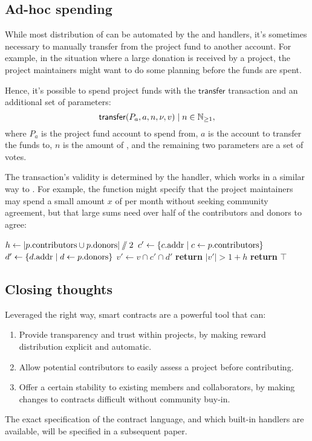 \subsection{Ad-hoc spending}

While most distribution of \oscoin{} can be automated by the 
and  handlers, it's sometimes necessary to manually
transfer \oscoin{} from the project fund to another account. For example, in
the situation where a large donation is received by a project, the project
maintainers might want to do some planning before the funds are spent.

Hence, it's possible to spend project funds with the $\mathsf{transfer}$
transaction and an additional set of parameters:
\[
    \mathsf{transfer}\lparen P_a, a, n, \nu, v\rparen \mid n \in \mathbb{N}_{\geq 1},
\]
where $P_a$ is the project fund account to spend from, $a$ is the account to
transfer the funds to, $n$ is the amount of \oscoin{}, and the remaining two
parameters are a set of votes.

The transaction's validity is determined by the  handler,
which works in a similar way to . For
example, the function might specify that the project maintainers may spend a small
amount $x$ of \oscoin{} per month without seeking community agreement, but that
large sums need over half of the contributors and donors to agree:
\medskip
\begin{algorithmic}[0]
            \State $h \gets |p.{\mathrm{contributors}} \cup p.{\mathrm{donors}}| \sslash 2$
            \State $c' \gets \{ c.{\mathrm{addr}} \mid c \gets p.{\mathrm{contributors}} \}$
            \State $d' \gets \{ d.{\mathrm{addr}} \mid d \gets p.{\mathrm{donors}} \}$
            \State $v' \gets v \cap c' \cap d'$
            \State \textbf{return} $|v'| > 1 + h$
            \Else
            \State \textbf{return} $\top$
        \EndIf
    \EndProcedure
\end{algorithmic}

\subsection{Closing thoughts}

Leveraged the right way, smart contracts are a powerful tool that can:

\begin{enumerate}
    \item Provide transparency and trust within projects, by making reward
        distribution explicit and automatic.
    \item Allow potential contributors to easily assess a project before contributing.
    \item Offer a certain stability to existing members and collaborators, by
        making changes to contracts difficult without community buy-in.
\end{enumerate}

\noindent The exact specification of the contract language, and which built-in handlers
are available, will be specified in a subsequent paper.
